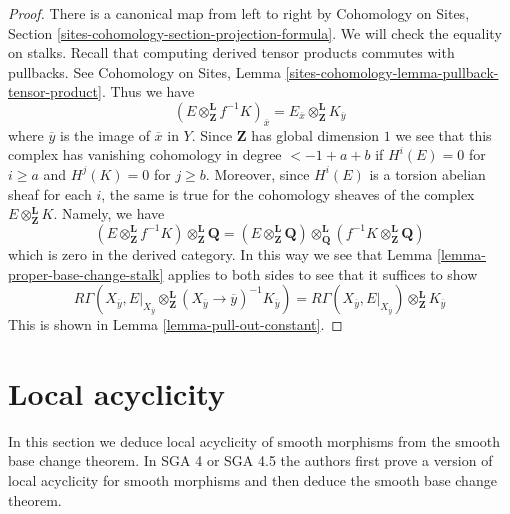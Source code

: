 \begin{proof}
There is a canonical map from left to right by
Cohomology on Sites, Section \ref{sites-cohomology-section-projection-formula}.
We will check the equality on stalks.
Recall that computing derived tensor products commutes with pullbacks.
See Cohomology on Sites, Lemma
\ref{sites-cohomology-lemma-pullback-tensor-product}.
Thus we have
$$
(E \otimes_\mathbf{Z}^\mathbf{L} f^{-1}K)_{\overline{x}}
=
E_{\overline{x}} \otimes_\mathbf{Z}^\mathbf{L} K_{\overline{y}}
$$
where $\overline{y}$ is the image of $\overline{x}$ in $Y$.
Since $\mathbf{Z}$ has global dimension $1$ we see that
this complex has vanishing cohomology in degree $< - 1 + a + b$
if $H^i(E) = 0$ for $i \geq a$ and $H^j(K) = 0$ for $j \geq b$.
Moreover, since $H^i(E)$ is a torsion abelian
sheaf for each $i$, the same is true for the cohomology
sheaves of the complex $E \otimes_\mathbf{Z}^\mathbf{L} K$.
Namely, we have
$$
(E \otimes_\mathbf{Z}^\mathbf{L} f^{-1}K)
\otimes_{\mathbf{Z}}^\mathbf{L} \mathbf{Q} =
(E \otimes_\mathbf{Z}^\mathbf{L} \mathbf{Q})
\otimes_{\mathbf{Q}}^\mathbf{L}
(f^{-1}K \otimes_{\mathbf{Z}}^\mathbf{L} \mathbf{Q})
$$
which is zero in the derived category.
In this way we see that Lemma \ref{lemma-proper-base-change-stalk}
applies to both sides to see that it suffices to show
$$
R\Gamma(X_{\overline{y}},
E|_{X_{\overline{y}}} \otimes_\mathbf{Z}^\mathbf{L}
(X_{\overline{y}} \to \overline{y})^{-1}K_{\overline{y}}) =
R\Gamma(X_{\overline{y}},
E|_{X_{\overline{y}}}) \otimes_\mathbf{Z}^\mathbf{L} K_{\overline{y}}
$$
This is shown in Lemma \ref{lemma-pull-out-constant}.
\end{proof}








\section{Local acyclicity}
\label{section-local-acyclicity}

\noindent
In this section we deduce local acyclicity of smooth morphisms
from the smooth base change theorem. In SGA 4 or SGA 4.5 the authors
first prove a version of local acyclicity for smooth morphisms
and then deduce the smooth base change theorem.

